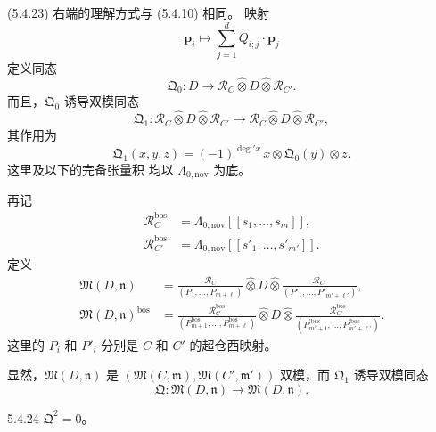 (5.4.23) 右端的理解方式与 (5.4.10) 相同。
映射
\[
\mathbf p_i
\longmapsto
\sum_{j=1}^{d}
Q_{i;j}\cdot\mathbf p_j
\]
定义同态
\[
\mathfrak Q_0\colon
D\longrightarrow
\mathcal R_C\widehat\otimes
D\widehat\otimes\mathcal R_{C'}.
\]
而且，$\mathfrak Q_0$ 诱导双模同态
\[
\mathfrak Q_1\colon
\mathcal R_C\widehat\otimes D
\widehat\otimes\mathcal R_{C'}
\longrightarrow
\mathcal R_C\widehat\otimes D
\widehat\otimes\mathcal R_{C'},
\]
其作用为
\[
\mathfrak Q_1(x,y,z)
=(-1)^{\deg' x}\,
x\otimes\mathfrak Q_0(y)\otimes z.
\]
这里及以下的完备张量积
均以 $\Lambda_{0,\mathrm{nov}}$ 为底。

再记
\[
\begin{aligned}
\mathcal R_C^{\mathrm{bos}}
&=\Lambda_{0,\mathrm{nov}}[[s_1,\ldots,s_m]],\\
\mathcal R_{C'}^{\mathrm{bos}}
&=\Lambda_{0,\mathrm{nov}}[[s'_1,\ldots,s'_{m'}]].
\end{aligned}
\]
定义
\[
\begin{aligned}
\mathfrak M(D,\mathfrak n)
&=
\frac{\mathcal R_C}
{(P_1,\ldots,P_{m+\ell})}
\widehat\otimes D\widehat\otimes
\frac{\mathcal R_{C'}}
{(P'_1,\ldots,P'_{m'+\ell'})},\\[2mm]
\mathfrak M(D,\mathfrak n)^{\mathrm{bos}}
&=
\frac{\mathcal R_C^{\mathrm{bos}}}
{(P_{m+1}^{\mathrm{bos}},
\ldots,P_{m+\ell}^{\mathrm{bos}})}
\widehat\otimes D\widehat\otimes
\frac{\mathcal R_{C'}^{\mathrm{bos}}}
{(P_{m'+1}^{\prime\mathrm{bos}},
\ldots,P_{m'+\ell'}^{\prime\mathrm{bos}})}.
\end{aligned}
\]
这里的 $P_i$ 和 $P'_i$
分别是 $C$ 和 $C'$ 的超仓西映射。

显然，$\mathfrak M(D,\mathfrak n)$
是
$(\mathfrak M(C,\mathfrak m),
\mathfrak M(C',\mathfrak m'))$
双模，而 $\mathfrak Q_1$
诱导双模同态
\[
\mathfrak Q\colon
\mathfrak M(D,\mathfrak n)
\longrightarrow
\mathfrak M(D,\mathfrak n).
\]

\begin{proposition}{5.4.24}\label{prop:5-4-24}
$\mathfrak Q^2=0$。
\end{proposition}

